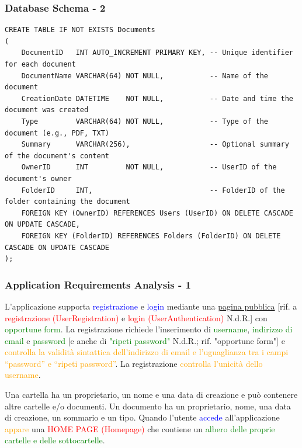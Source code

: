 \documentclass[aspectratio=169]{beamer}
\begin{document}
\begin{frame}[fragile]
    \frametitle{Database Schema - 2}
    \scriptsize
    \begin{verbatim}
CREATE TABLE IF NOT EXISTS Documents
(
    DocumentID   INT AUTO_INCREMENT PRIMARY KEY, -- Unique identifier for each document
    DocumentName VARCHAR(64) NOT NULL,           -- Name of the document
    CreationDate DATETIME    NOT NULL,           -- Date and time the document was created
    Type         VARCHAR(64) NOT NULL,           -- Type of the document (e.g., PDF, TXT)
    Summary      VARCHAR(256),                   -- Optional summary of the document's content
    OwnerID      INT         NOT NULL,           -- UserID of the document's owner
    FolderID     INT,                            -- FolderID of the folder containing the document
    FOREIGN KEY (OwnerID) REFERENCES Users (UserID) ON DELETE CASCADE ON UPDATE CASCADE,
    FOREIGN KEY (FolderID) REFERENCES Folders (FolderID) ON DELETE CASCADE ON UPDATE CASCADE
);
\end{verbatim}
\end{frame}

\begin{frame}
    \frametitle{Application Requirements Analysis - 1}
    L’applicazione supporta \textcolor{Blue}{registrazione} e \textcolor{Blue}{login} mediante una
    \underline{pagina pubblica} [rif. a \textcolor{Red}{registrazione (UserRegistration)} e
        \textcolor{Red}{login (UserAuthentication)} N.d.R.] con \textcolor{Green}{opportune form}.
    La registrazione richiede l’inserimento di \textcolor{Green}{username}, \textcolor{Green}{indirizzo di email} e
    \textcolor{Green}{password} [e anche di \textcolor{Green}{"ripeti password"} N.d.R.; rif. "opportune form"] e
    \textcolor{Orange}{controlla la validità sintattica dell’indirizzo di email e l’uguaglianza tra i campi “password”
        e “ripeti password”}. La registrazione \textcolor{Orange}{controlla l’unicità dello username}. \newline

    Una cartella ha un proprietario, un nome e una data di creazione e può contenere altre cartelle e/o documenti. Un
    documento ha un proprietario, nome, una data di creazione, un sommario e un tipo.
    Quando l’utente \textcolor{Blue}{accede} all’applicazione \textcolor{Orange}{appare} una
    \textcolor{Red}{HOME PAGE (Homepage)} che contiene un \textcolor{Green}{albero delle proprie cartelle e delle
        sottocartelle}.\footnotemark{}

\end{frame}
\end{document}
